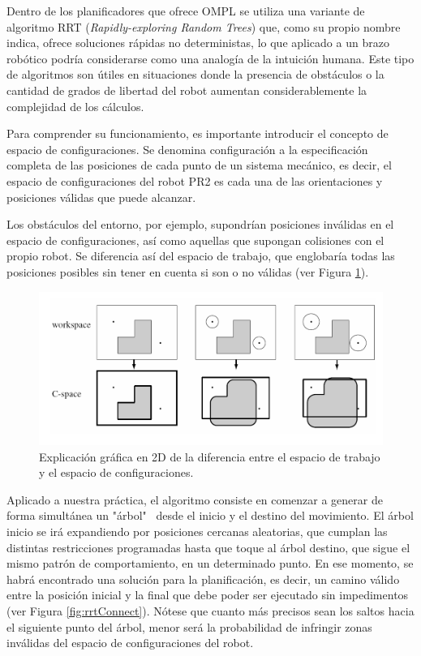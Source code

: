 \documentclass[12pt,spanish,chapterprefix, numbers=noenddot]{book}
\numberwithin{equation}{section}
\numberwithin{figure}{section}
\begin{document}
Dentro de los planificadores que ofrece OMPL se utiliza una variante de algoritmo RRT (\textit{Rapidly-exploring Random Trees}) que, como su propio nombre indica, ofrece soluciones rápidas no deterministas, lo que aplicado a un brazo robótico podría considerarse como una analogía de la intuición humana. Este tipo de algoritmos son útiles en situaciones donde la presencia de obstáculos o la cantidad de grados de libertad del robot aumentan considerablemente la complejidad de los cálculos.  

Para comprender su funcionamiento, es importante introducir el concepto de espacio de configuraciones. Se denomina configuración a la especificación completa de las posiciones de cada punto de un sistema mecánico, es decir, el espacio de configuraciones del robot PR2 es cada una de las orientaciones y posiciones válidas que puede alcanzar. 

Los obstáculos del entorno, por ejemplo, supondrían posiciones inválidas en el espacio de configuraciones, así como aquellas que supongan colisiones con el propio robot. Se diferencia así del espacio de trabajo, que englobaría todas las posiciones posibles sin tener en cuenta si son o no válidas (ver Figura \ref{fig:cspace}). 

\begin{figure}[hbt!]
\centering
\includegraphics[width=12cm]{Figs/cspace_vs_workspace.png}
\par
\caption{\label{fig:cspace}Explicación gráfica en 2D de la diferencia entre el espacio de trabajo y el espacio de configuraciones.}
\end{figure}

Aplicado a nuestra práctica, el algoritmo consiste en comenzar a generar de forma simultánea un "árbol" \ desde el inicio y el destino del movimiento. El árbol inicio se irá expandiendo por posiciones cercanas aleatorias, que cumplan las distintas restricciones programadas hasta que toque al árbol destino, que sigue el mismo patrón de comportamiento, en un determinado punto. En ese momento, se habrá encontrado una solución para la planificación, es decir, un camino válido entre la posición inicial y la final que debe poder ser ejecutado sin impedimentos (ver Figura \ref{fig:rrtConnect}). Nótese que cuanto más precisos sean los saltos hacia el siguiente punto del árbol, menor será la probabilidad de infringir zonas inválidas del espacio de configuraciones del robot. 
\end{document}
